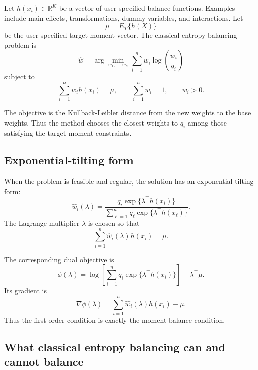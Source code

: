 \documentclass[11pt]{article}
\begin{document}
Let $h(x_i)\in\mathbb{R}^K$ be a vector of user-specified balance functions. Examples include main effects, transformations, dummy variables, and interactions. Let
\begin{equation*}
\mu = E_T\{h(X)\}
\end{equation*}
be the user-specified target moment vector. The classical entropy balancing problem is
\begin{equation*}
\widehat w
=
\arg\min_{w_1,\ldots,w_n}
\sum_{i=1}^n w_i\log\left(\frac{w_i}{q_i}\right)
\end{equation*}
subject to
\begin{equation*}
\sum_{i=1}^n w_i h(x_i)=\mu,
\qquad
\sum_{i=1}^n w_i=1,
\qquad
w_i>0.
\end{equation*}

The objective is the Kullback-Leibler distance from the new weights to the base weights. Thus the method chooses the closest weights to $q_i$ among those satisfying the target moment constraints.

\subsection{Exponential-tilting form}

When the problem is feasible and regular, the solution has an exponential-tilting form:
\begin{equation*}
\widehat w_i(\lambda)
=
\frac{q_i\exp\{\lambda^\top h(x_i)\}}
{\sum_{\ell=1}^n q_\ell\exp\{\lambda^\top h(x_\ell)\}}.
\end{equation*}
The Lagrange multiplier $\lambda$ is chosen so that
\begin{equation*}
\sum_{i=1}^n \widehat w_i(\lambda)h(x_i)=\mu.
\end{equation*}

The corresponding dual objective is
\begin{equation*}
\phi(\lambda)
=
\log\left[\sum_{i=1}^n q_i\exp\{\lambda^\top h(x_i)\}\right]-\lambda^\top\mu.
\end{equation*}
Its gradient is
\begin{equation*}
\nabla\phi(\lambda)=\sum_{i=1}^n \widehat w_i(\lambda)h(x_i)-\mu.
\end{equation*}
Thus the first-order condition is exactly the moment-balance condition.

\subsection{What classical entropy balancing can and cannot balance}
\end{document}
